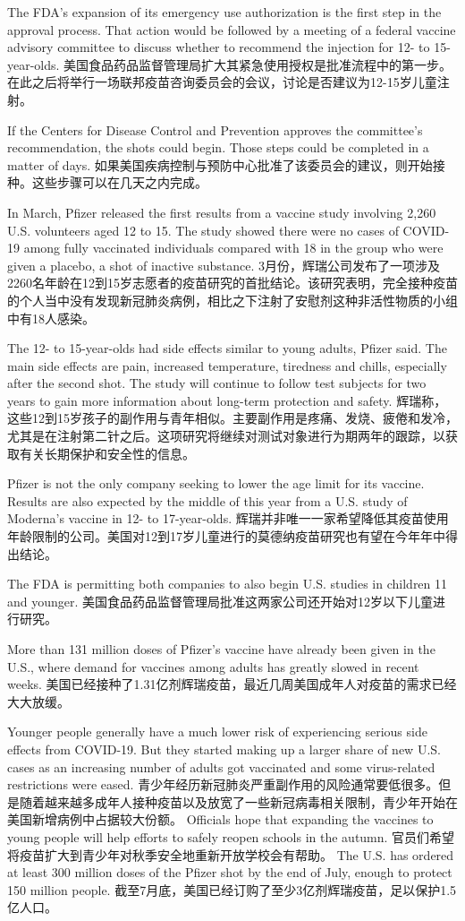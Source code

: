 The FDA’s expansion of its emergency use authorization is the first step in the approval process. That action would be followed by a meeting of a federal vaccine advisory committee to discuss whether to recommend the injection for 12- to 15-year-olds.
美国食品药品监督管理局扩大其紧急使用授权是批准流程中的第一步。在此之后将举行一场联邦疫苗咨询委员会的会议，讨论是否建议为12-15岁儿童注射。

If the Centers for Disease Control and Prevention approves the committee’s recommendation, the shots could begin. Those steps could be completed in a matter of days.
如果美国疾病控制与预防中心批准了该委员会的建议，则开始接种。这些步骤可以在几天之内完成。

In March, Pfizer released the first results from a vaccine study involving 2,260 U.S. volunteers aged 12 to 15. The study showed there were no cases of COVID-19 among fully vaccinated individuals compared with 18 in the group who were given a placebo, a shot of inactive substance.
3月份，辉瑞公司发布了一项涉及2260名年龄在12到15岁志愿者的疫苗研究的首批结论。该研究表明，完全接种疫苗的个人当中没有发现新冠肺炎病例，相比之下注射了安慰剂这种非活性物质的小组中有18人感染。

The 12- to 15-year-olds had side effects similar to young adults, Pfizer said. The main side effects are pain, increased temperature, tiredness and chills, especially after the second shot. The study will continue to follow test subjects for two years to gain more information about long-term protection and safety.
辉瑞称，这些12到15岁孩子的副作用与青年相似。主要副作用是疼痛、发烧、疲倦和发冷，尤其是在注射第二针之后。这项研究将继续对测试对象进行为期两年的跟踪，以获取有关长期保护和安全性的信息。

Pfizer is not the only company seeking to lower the age limit for its vaccine. Results are also expected by the middle of this year from a U.S. study of Moderna’s vaccine in 12- to 17-year-olds.
辉瑞并非唯一一家希望降低其疫苗使用年龄限制的公司。美国对12到17岁儿童进行的莫德纳疫苗研究也有望在今年年中得出结论。

The FDA is permitting both companies to also begin U.S. studies in children 11 and younger.
美国食品药品监督管理局批准这两家公司还开始对12岁以下儿童进行研究。

More than 131 million doses of Pfizer’s vaccine have already been given in the U.S., where demand for vaccines among adults has greatly slowed in recent weeks.
美国已经接种了1.31亿剂辉瑞疫苗，最近几周美国成年人对疫苗的需求已经大大放缓。

Younger people generally have a much lower risk of experiencing serious side effects from COVID-19. But they started making up a larger share of new U.S. cases as an increasing number of adults got vaccinated and some virus-related restrictions were eased.
青少年经历新冠肺炎严重副作用的风险通常要低很多。但是随着越来越多成年人接种疫苗以及放宽了一些新冠病毒相关限制，青少年开始在美国新增病例中占据较大份额。
Officials hope that expanding the vaccines to young people will help efforts to safely reopen schools in the autumn.
官员们希望将疫苗扩大到青少年对秋季安全地重新开放学校会有帮助。
The U.S. has ordered at least 300 million doses of the Pfizer shot by the end of July, enough to protect 150 million people.
截至7月底，美国已经订购了至少3亿剂辉瑞疫苗，足以保护1.5亿人口。

